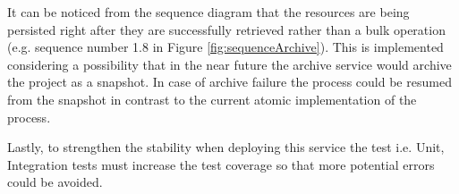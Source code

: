 It can be noticed from the sequence diagram that the resources are being persisted right after they are successfully retrieved rather than a bulk operation
(e.g. sequence number 1.8 in Figure \ref{fig:sequenceArchive}). This
is implemented considering a possibility that in the near future the archive service would archive the project as a snapshot. In case of archive failure the process
could be resumed from the snapshot in contrast to the current atomic implementation of the process.

Lastly, to strengthen the stability when deploying this service the test i.e. Unit, Integration tests must increase the test coverage so that more potential
errors could be avoided. 


